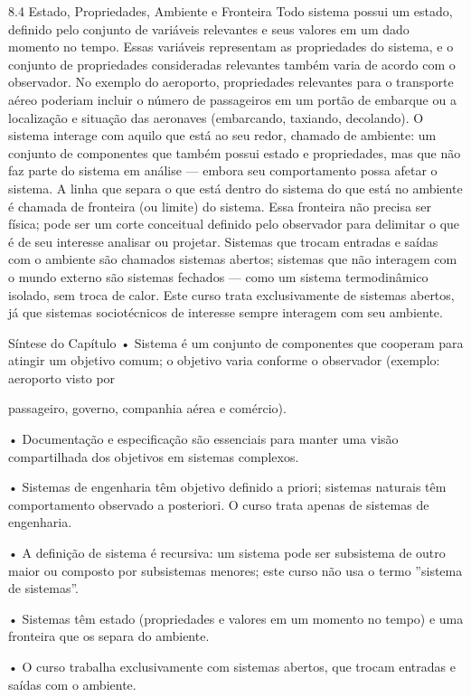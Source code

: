 8.4 Estado, Propriedades, Ambiente e Fronteira Todo sistema possui um estado, definido pelo conjunto de variáveis relevantes e seus valores em um dado momento no tempo. Essas variáveis representam as propriedades do sistema, e o conjunto de propriedades consideradas relevantes também varia de acordo com o observador. No exemplo do aeroporto, propriedades relevantes para o transporte aéreo poderiam incluir o número de passageiros em um portão de embarque ou a localização e situação das aeronaves (embarcando, taxiando, decolando). O sistema interage com aquilo que está ao seu redor, chamado de ambiente: um conjunto de componentes que também possui estado e propriedades, mas que não faz parte do sistema em análise — embora seu comportamento possa afetar o sistema. A linha que separa o que está dentro do sistema do que está no ambiente é chamada de fronteira (ou limite) do sistema. Essa fronteira não precisa ser física; pode ser um corte conceitual definido pelo observador para delimitar o que é de seu interesse analisar ou projetar. Sistemas que trocam entradas e saídas com o ambiente são chamados sistemas abertos; sistemas que não interagem com o mundo externo são sistemas fechados — como um sistema termodinâmico isolado, sem troca de calor. Este curso trata exclusivamente de sistemas abertos, já que sistemas sociotécnicos de interesse sempre interagem com seu ambiente.

Síntese do Capítulo • Sistema é um conjunto de componentes que cooperam para atingir um objetivo comum; o objetivo varia conforme o observador (exemplo: aeroporto visto por

passageiro, governo, companhia aérea e comércio).

• Documentação e especificação são essenciais para manter uma visão compartilhada dos objetivos em sistemas complexos.

• Sistemas de engenharia têm objetivo definido a priori; sistemas naturais têm comportamento observado a posteriori. O curso trata apenas de sistemas de engenharia.

• A definição de sistema é recursiva: um sistema pode ser subsistema de outro maior ou composto por subsistemas menores; este curso não usa o termo ”sistema de sistemas”.

• Sistemas têm estado (propriedades e valores em um momento no tempo) e uma fronteira que os separa do ambiente.

• O curso trabalha exclusivamente com sistemas abertos, que trocam entradas e saídas com o ambiente.

